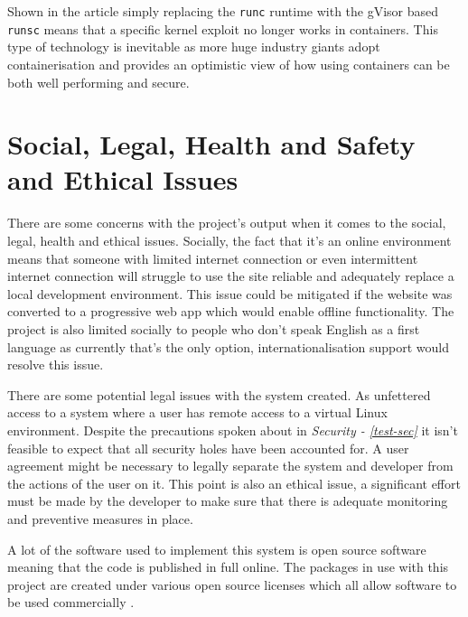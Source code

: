 \documentclass[12pt, a4paper]{extreport}
\begin{document}
Shown in the article \cite{gvisor-info} simply replacing the \texttt{runc} runtime with the gVisor based \texttt{runsc} means that a specific kernel exploit no longer works in containers. This type of technology is inevitable as more huge industry giants adopt containerisation and provides an optimistic view of how using containers can be both well performing and secure.

\pagebreak


\chapter{Social, Legal, Health and Safety and Ethical Issues}


There are some concerns with the project's output when it comes to the social, legal, health and ethical issues. Socially, the fact that it's an online environment means that someone with limited internet connection or even intermittent internet connection will struggle to use the site reliable and adequately replace a local development environment. This issue could be mitigated if the website was converted to a progressive web app which would enable offline functionality. The project is also limited socially to people who don't speak English as a first language as currently that's the only option, internationalisation support would resolve this issue.

There are some potential legal issues with the system created. As unfettered access to a system where a user has remote access to a virtual Linux environment. Despite the precautions spoken about in \textit{Security - \ref{test-sec}} it isn't feasible to expect that all security holes have been accounted for. A user agreement might be necessary to legally separate the system and developer from the actions of the user on it. This point is also an ethical issue, a significant effort must be made by the developer to make sure that there is adequate monitoring and preventive measures in place.

A lot of the software used to implement this system is open source software meaning that the code is published in full online. The packages in use with this project are created under various open source licenses which all allow software to be used commercially \cite{opensource-licenses}.
\end{document}
